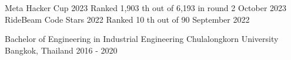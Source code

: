 \documentclass[]{awesome-cv}
\begin{document}
\begin{cvhonors}
	\cvhonor
	{Meta Hacker Cup 2023}
	{Ranked 1,903 th out of 6,193 in round 2}
	{October 2023}
	\cvhonor
	{RideBeam Code Stars 2022}
	{Ranked 10 th out of 90}
	{September 2022}
\end{cvhonors}

\begin{cventries}
	\cventry
	{Bachelor of Engineering in Industrial Engineering}
	{Chulalongkorn University}
	{Bangkok, Thailand}
	{2016 - 2020}
	{}
\end{cventries}

\let\clearpage\relax
\end{document}
